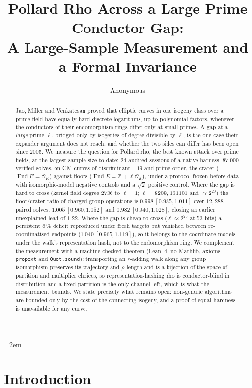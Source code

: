 \documentclass[10pt,a4paper]{article}
\title{Pollard Rho Across a Large Prime Conductor Gap:\\
       A Large-Sample Measurement and a Formal Invariance}
\author{Anonymous}
\date{}
\newcommand{\ZZ}{\mathbb{Z}}
\newcommand{\OK}{\mathcal{O}_K}
\newcommand{\End}{\operatorname{End}}
\theoremstyle{remark}
\begin{document}
\maketitle
\emergencystretch=2em

\begin{abstract}
Jao, Miller and Venkatesan proved that elliptic curves in one isogeny
class over a prime field have equally hard discrete logarithms, up to
polynomial factors, whenever the conductors of their endomorphism rings
differ only at small primes. A gap at a \emph{large} prime $\ell$,
bridged only by isogenies of degree divisible by $\ell$, is the one case
their expander argument does not reach, and whether the two sides can
differ has been open since 2005. We measure the question for Pollard
rho, the best known attack over prime fields, at the largest sample size
to date: 24 audited sessions of a native harness, 87{,}000 verified
solves, on CM curves of discriminant $-19$ and prime order, the crater
($\End E = \OK$) against floors ($\End E = \ZZ + \ell\OK$), under a
protocol frozen before data with isomorphic-model negative controls and
a $\sqrt2$ positive control. Where the gap is hard to cross (kernel field
degree $2736$ to $\ell-1$; $\ell = 8209$, $131101$ and $\approx 2^{20}$)
the floor/crater ratio of charged group operations is
$0.998\ [0.985, 1.011]$ over $12{,}288$ paired solves,
$1.005\ [0.960, 1.052]$ and $0.982\ [0.940, 1.028]$, closing an earlier
unexplained lead of $1.22$. Where the gap is cheap to cross
($\ell \approx 2^{25}$ at 53 bits) a persistent $8\,\%$ deficit
reproduced under fresh targets but vanished between re-coordinatised
endpoints ($1.040\ [0.965, 1.119]$), so it belongs to the coordinate
models under the walk's representation hash, not to the endomorphism
ring. We complement the measurement with a machine-checked theorem
(Lean~4, no Mathlib, axioms \texttt{propext} and \texttt{Quot.sound}):
transporting an $r$-adding walk along any group isomorphism preserves its
trajectory and $\rho$-length and is a bijection of the space of partition
and multiplier choices, so representation-hashing rho is conductor-blind
in distribution and a fixed partition is the only channel left, which is
what the measurement bounds. We state precisely what remains open:
non-generic algorithms are bounded only by the cost of the connecting
isogeny, and a proof of equal hardness is unavailable for any curve.
\end{abstract}

\section{Introduction}
\end{document}
